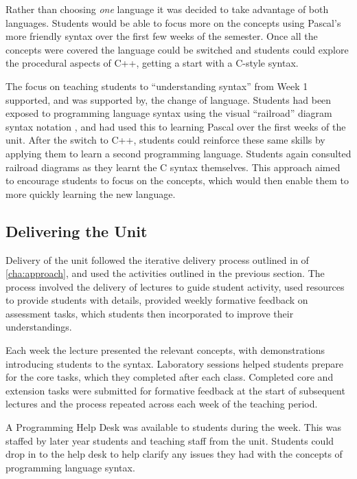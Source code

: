 Rather than choosing \emph{one} language it was decided to take advantage of both languages. Students would be able to focus more on the concepts using Pascal's more friendly syntax over the first few weeks of the semester. Once all the concepts were covered the language could be switched and students could explore the procedural aspects of C++, getting a start with a C-style syntax.

The focus on teaching students to ``understanding syntax'' from Week 1 supported, and was supported by, the change of language. Students had been exposed to programming language syntax using the visual ``railroad'' diagram syntax notation \cite{Braz:1990}, and had used this to learning Pascal over the first weeks of the unit. After the switch to C++, students could reinforce these same skills by applying them to learn a second programming language. Students again consulted railroad diagrams as they learnt the C syntax themselves. This approach aimed to encourage students to focus on the concepts, which would then enable them to more quickly learning the new language.




\subsection{Delivering the Unit} %
\label{sub:delivering_the_unit}

Delivery of the unit followed the iterative delivery process outlined in  of \cref{cha:approach}, and used the activities outlined in the previous section. The process involved the delivery of lectures to guide student activity, used resources to provide students with details, provided weekly formative feedback on assessment tasks, which students then incorporated to improve their understandings. 

Each week the lecture presented the relevant concepts, with demonstrations introducing students to the syntax. Laboratory sessions helped students prepare for the core tasks, which they completed after each class. Completed core and extension tasks were submitted for formative feedback at the start of subsequent lectures and the process repeated across each week of the teaching period.

A Programming Help Desk was available to students during the week. This was staffed by later year students and teaching staff from the unit. Students could drop in to the help desk to help clarify any issues they had with the concepts of programming language syntax.

